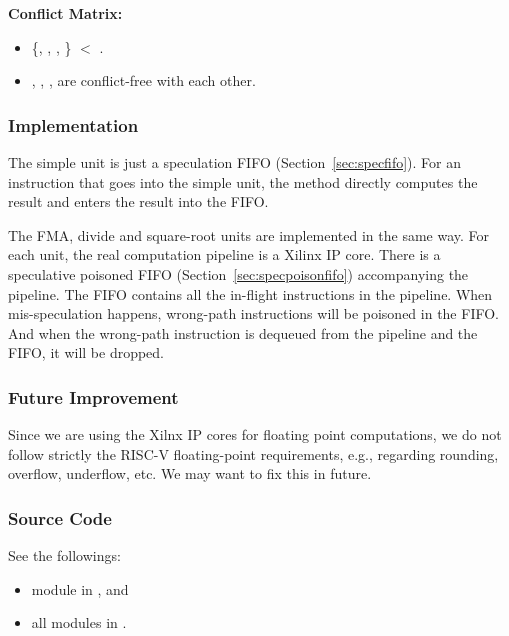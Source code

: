 \noindent\textbf{Conflict Matrix:}
\begin{itemize}
    \item \{, , , \} $<$ .
    \item {}, , ,  are conflict-free with each other.
\end{itemize}


\subsubsection{Implementation}
The simple unit is just a speculation FIFO (Section~\ref{sec:specfifo}).
For an instruction that goes into the simple unit, the  method directly computes the result and enters the result into the FIFO.

The FMA, divide and square-root units are implemented in the same way.
For each unit, the real computation pipeline is a Xilinx IP core.
There is a speculative poisoned FIFO (Section~\ref{sec:specpoisonfifo}) accompanying the pipeline.
The FIFO contains all the in-flight instructions in the pipeline.
When mis-speculation happens, wrong-path instructions will be poisoned in the FIFO.
And when the wrong-path instruction is dequeued from the pipeline and the FIFO, it will be dropped.

\subsubsection{Future Improvement}
Since we are using the Xilnx IP cores for floating point computations, we do not follow strictly the RISC-V floating-point requirements, e.g., regarding rounding, overflow, underflow, etc.
We may want to fix this in future.

\subsubsection{Source Code}
See the followings:
\begin{itemize}
    \item module  in , and
    \item all modules in .
\end{itemize}
